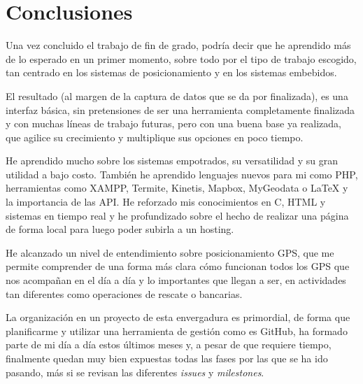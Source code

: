 

\section{Conclusiones}
Una vez concluido el trabajo de fin de grado, podría decir que he aprendido más de lo esperado en un primer momento, sobre todo por el tipo de trabajo escogido, tan centrado en los sistemas de posicionamiento y en los sistemas embebidos.

El resultado (al margen de la captura de datos que se da por finalizada), es una interfaz básica, sin pretensiones de ser una herramienta completamente finalizada y con muchas líneas de trabajo futuras, pero con una buena base ya realizada, que agilice su crecimiento y multiplique sus opciones en poco tiempo.

He aprendido mucho sobre los sistemas empotrados, su versatilidad y su gran utilidad a bajo costo. También he aprendido lenguajes nuevos para mi como PHP, herramientas como XAMPP, Termite, Kinetis, Mapbox, MyGeodata o LaTeX y la importancia de las API. He  reforzado mis conocimientos en C, HTML y sistemas en tiempo real y he profundizado sobre el hecho de realizar una página de forma local para luego poder subirla a un hosting.

He alcanzado un nivel de entendimiento sobre posicionamiento GPS, que me permite comprender de una forma más clara cómo funcionan todos los GPS que nos acompañan en el día a día y lo importantes que llegan a ser, en actividades tan diferentes como operaciones de rescate o bancarias.

La organización en un proyecto de esta envergadura es primordial, de forma que planificarme y utilizar una herramienta de gestión como es GitHub, ha formado parte de mi día a día estos últimos meses y, a pesar de que requiere tiempo, finalmente quedan muy bien expuestas todas las fases por las que se ha ido pasando, más si se revisan las diferentes \textit{issues} y \textit{milestones}.


